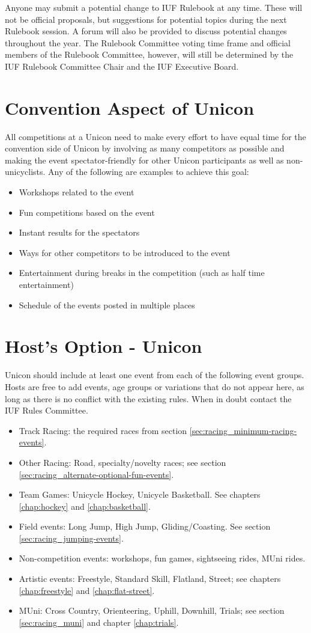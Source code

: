 Anyone may submit a potential change to IUF Rulebook at any time.
These will not be official proposals, but suggestions for potential topics during the next Rulebook session.
A forum will also be provided to discuss potential changes throughout the year.
The Rulebook Committee voting time frame and official members of the Rulebook Committee, however, will still be determined by the IUF Rulebook Committee Chair and the IUF Executive Board.

\section{Convention Aspect of Unicon}
All competitions at a Unicon need to make every effort to have equal time for the convention side of Unicon by involving as many competitors as possible and making the event spectator-friendly for other Unicon participants as well as non-unicyclists.
Any of the following are examples to achieve this goal:
\begin{itemize}
  \item Workshops related to the event
  \item Fun competitions based on the event
  \item Instant results for the spectators
  \item Ways for other competitors to be introduced to the event
  \item Entertainment during breaks in the competition (such as half time entertainment)
  \item Schedule of the events posted in multiple places
\end{itemize}

\section{Host's Option - Unicon}
Unicon should include at least one event from each of the following event groups. 
Hosts are free to add events, age groups or variations that do not appear here, as long as there is no conflict with the existing rules. 
When in doubt contact the IUF Rules Committee.
\begin{itemize}
  \item Track Racing: the required races from section \ref{sec:racing_minimum-racing-events}.
  \item Other Racing: Road, specialty/novelty races; see section \ref{sec:racing_alternate-optional-fun-events}.
  \item Team Games: Unicycle Hockey, Unicycle Basketball. See chapters \ref{chap:hockey} and \ref{chap:basketball}.
  \item Field events: Long Jump, High Jump, Gliding/Coasting. See section \ref{sec:racing_jumping-events}.
  \item Non-competition events: workshops, fun games, sightseeing rides, MUni rides.
  \item Artistic events: Freestyle, Standard Skill, Flatland, Street; see chapters \ref{chap:freestyle} and \ref{chap:flat-street}.
  \item MUni: Cross Country, Orienteering, Uphill, Downhill, Trials; see section \ref{sec:racing_muni} and chapter \ref{chap:trials}.
\end{itemize}

